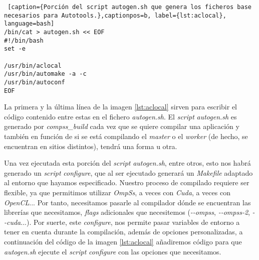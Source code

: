\begin{minipage}{\linewidth}
\begin{lstlisting} [caption={Porción del script autogen.sh que genera los ficheros base necesarios para Autotools.},captionpos=b, label={lst:aclocal}, language=bash]
/bin/cat > autogen.sh << EOF
#!/bin/bash
set -e

/usr/bin/aclocal
/usr/bin/automake -a -c
/usr/bin/autoconf
EOF       
\end{lstlisting}
\end{minipage}

\par\bigskip

La primera y la última línea de la imagen \ref{lst:aclocal} sirven para escribir el código contenido entre estas en el fichero \textit{autogen.sh}. El \textit{script} \textit{autogen.sh} es generado por \textit{compss\_build} cada vez que se quiere compilar una aplicación y también en función de si se está compilando el \textit{master} o el \textit{worker} (de hecho, se encuentran en sitios distintos), tendrá una forma u otra. 
\par\smallskip

Una vez ejecutada esta porción del \textit{script} \textit{autogen.sh}, entre otros, esto nos habrá generado un \textit{script} \textit{configure}, que al ser ejecutado generará un \textit{Makefile} adaptado al entorno que hayamos especificado. Nuestro proceso de compilado requiere ser flexible, ya que permitimos utilizar \textit{OmpSs}, a veces con \textit{Cuda}, a veces con \textit{OpenCL}... Por tanto, necesitamos pasarle al compilador dónde se encuentran las librerías que necesitamos, \textit{flags} adicionales que necesitemos (\textit{-{}-ompss}, \textit{-{}-ompss-2}, \textit{-{}-cuda}...). Por suerte, este \textit{configure}, nos permite pasar variables de entorno a tener en cuenta durante la compilación, además de opciones personalizadas, a continuación del código de la imagen \ref{lst:aclocal} añadiremos código para que \textit{autogen.sh} ejecute el \textit{script} \textit{configure} con las opciones que necesitamos.
\bigskip

